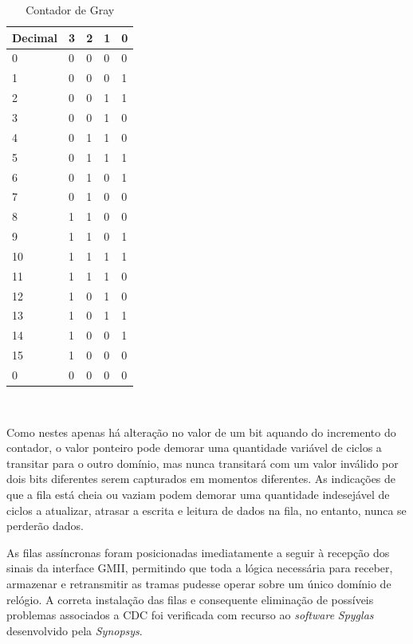 \begin{table}[H]
\begin{center} 
\begin{tabular}{|l|l|l|l|l|}

    \hline
    Decimal &  3 & 2 & 1 & 0 \\
    \hline
    0 & 0 & 0 & 0 & 0 \\
    \hline
    1 & 0 & 0 & 0 & \cellcolor{blue!25}1 \\
    \hline
    2 & 0 & 0 & \cellcolor{blue!25}1 & 1 \\
    \hline
    3 & 0 & 0 & 1 & \cellcolor{blue!25}0 \\
    \hline
    4 & 0 & \cellcolor{blue!25}1 & 1 & 0 \\
    \hline
    5 & 0 & 1 & 1 & \cellcolor{blue!25}1 \\
    \hline
    6 & 0 & 1 & \cellcolor{blue!25}0 & 1 \\
    \hline
    7 & 0 & 1 & 0 & \cellcolor{blue!25}0 \\
    \hline
    8 & \cellcolor{blue!25}1 & 1 & 0 & 0 \\
    \hline
    9 & 1 & 1 & 0 & \cellcolor{blue!25}1 \\
    \hline
    10 & 1 & 1 & \cellcolor{blue!25}1 & 1 \\
    \hline
    11 & 1 & 1 & 1 & \cellcolor{blue!25}0 \\
    \hline
    12 & 1 & \cellcolor{blue!25}0 & 1 & 0 \\
    \hline
    13 & 1 & 0 & 1 & \cellcolor{blue!25}1 \\
    \hline
    14 & 1 & 0 & \cellcolor{blue!25}0 & 1 \\
    \hline
    15 & 1 & 0 & 0 & \cellcolor{blue!25}0 \\
    \hline
    0 & \cellcolor{blue!25}0 & 0 & 0 & 0 \\
    \hline
    
\end{tabular}
\end{center}
\caption{Contador de Gray}\label{Contador de Gray}
\end{table}

\

Como nestes apenas há alteração no valor de um bit aquando do incremento do contador, o valor ponteiro pode demorar uma quantidade variável de ciclos a transitar para o outro domínio, mas nunca transitará com um valor inválido por dois bits diferentes serem capturados em momentos diferentes. As indicações de que a fila está cheia ou vaziam podem demorar uma quantidade indesejável de ciclos a atualizar, atrasar a escrita e leitura de dados na fila, no entanto, nunca se perderão dados. \par 
As filas assíncronas foram posicionadas imediatamente a seguir à recepção dos sinais da interface GMII, permitindo que toda a lógica necessária para receber, armazenar e retransmitir as tramas pudesse operar sobre um único domínio de relógio. A correta instalação das filas e consequente eliminação de possíveis problemas associados a CDC foi verificada com recurso ao \textit{software} \textit{Spyglas} desenvolvido pela \textit{Synopsys}.   



